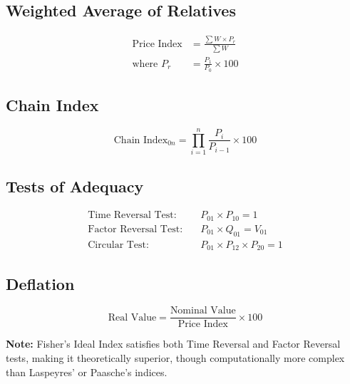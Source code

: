 \documentclass[twoside]{book}
\begin{document}
\subsection{Weighted Average of Relatives}
\begin{align}
\text{Price Index} &= \frac{\sum W \times P_r}{\sum W} \\
\text{where } P_r &= \frac{P_1}{P_0} \times 100
\end{align}

\subsection{Chain Index}
\begin{equation}
\text{Chain Index}_{0n} = \prod_{i=1}^{n} \frac{P_i}{P_{i-1}} \times 100
\end{equation}

\subsection{Tests of Adequacy}
\begin{align}
\text{Time Reversal Test:} \quad & P_{01} \times P_{10} = 1 \\
\text{Factor Reversal Test:} \quad & P_{01} \times Q_{01} = V_{01} \\
\text{Circular Test:} \quad & P_{01} \times P_{12} \times P_{20} = 1
\end{align}

\subsection{Deflation}
\begin{equation}
\text{Real Value} = \frac{\text{Nominal Value}}{\text{Price Index}} \times 100
\end{equation}

\vspace{1cm}

\textbf{Note:} Fisher's Ideal Index satisfies both Time Reversal and Factor Reversal tests, making it theoretically superior, though computationally more complex than Laspeyres' or Paasche's indices.
\end{document}
